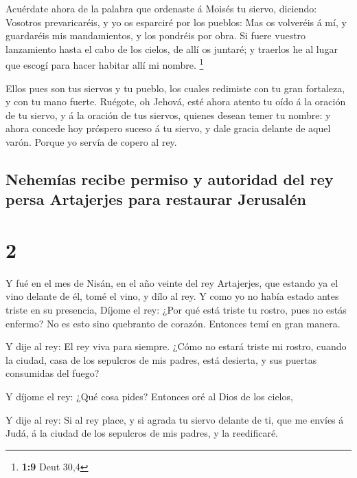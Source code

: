  Acuérdate ahora de la palabra que ordenaste á Moisés tu
siervo, diciendo: Vosotros prevaricaréis, y yo os esparciré por los
pueblos:  Mas os volveréis á mí, y guardaréis mis
mandamientos, y los pondréis por obra. Si fuere vuestro lanzamiento
hasta el cabo de los cielos, de allí os juntaré; y traerlos he al lugar
que escogí para hacer habitar allí mi nombre. \footnote{\textbf{1:9}
  Deut 30,4}

 Ellos pues son tus siervos y tu pueblo, los cuales
redimiste con tu gran fortaleza, y con tu mano fuerte. 
Ruégote, oh Jehová, esté ahora atento tu oído á la oración de tu siervo,
y á la oración de tus siervos, quienes desean temer tu nombre: y ahora
concede hoy próspero suceso á tu siervo, y dale gracia delante de aquel
varón. Porque yo servía de copero al rey.

\hypertarget{nehemuxedas-recibe-permiso-y-autoridad-del-rey-persa-artajerjes-para-restaurar-jerusaluxe9n}{%
\subsection{Nehemías recibe permiso y autoridad del rey persa Artajerjes
para restaurar
Jerusalén}\label{nehemuxedas-recibe-permiso-y-autoridad-del-rey-persa-artajerjes-para-restaurar-jerusaluxe9n}}

\hypertarget{section-1}{%
\section{2}\label{section-1}}

 Y fué en el mes de Nisán, en el año veinte del rey
Artajerjes, que estando ya el vino delante de él, tomé el vino, y dílo
al rey. Y como yo no había estado antes triste en su presencia,
 Díjome el rey: ¿Por qué está triste tu rostro, pues no
estás enfermo? No es esto sino quebranto de corazón. Entonces temí en
gran manera.

 Y dije al rey: El rey viva para siempre. ¿Cómo no estará
triste mi rostro, cuando la ciudad, casa de los sepulcros de mis padres,
está desierta, y sus puertas consumidas del fuego?

 Y díjome el rey: ¿Qué cosa pides? Entonces oré al Dios de
los cielos,

 Y dije al rey: Si al rey place, y si agrada tu siervo
delante de ti, que me envíes á Judá, á la ciudad de los sepulcros de mis
padres, y la reedificaré.

